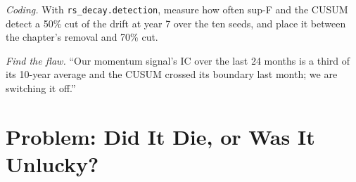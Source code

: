 \begin{exercise}[$\star\star\star$]\label{exo:rs:half-life-decay-and-stability:7}
\emph{Coding.} With \texttt{rs\_decay.detection}, measure how often sup-F and the CUSUM detect a 50\% cut of the drift at year 7 over the
ten seeds, and place it between the chapter's removal and 70\% cut.
\end{exercise}

\begin{exercise}[$\star\star\star$]\label{exo:rs:half-life-decay-and-stability:8}
\emph{Find the flaw.} ``Our momentum signal's IC over the last 24 months is a third of its 10-year average and the CUSUM crossed its boundary last
month; we are switching it off.''
\end{exercise}

\section{Problem: Did It Die, or Was It Unlucky?}


